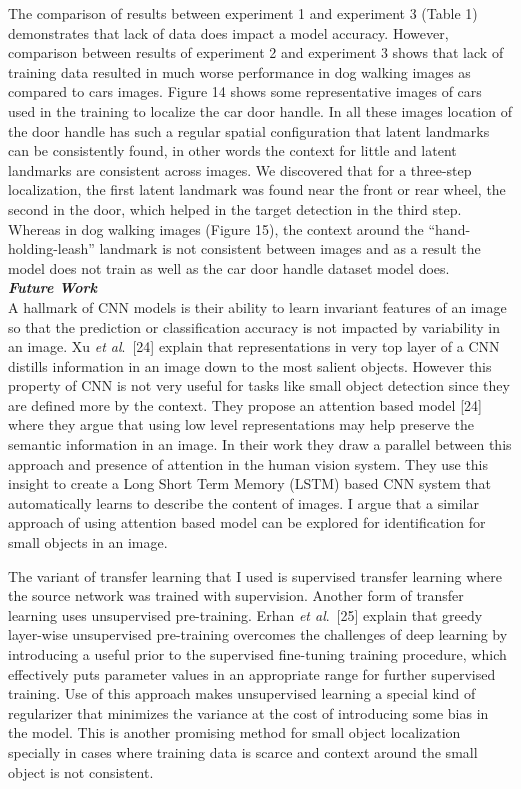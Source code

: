 \documentclass [11pt,letterpaper ,twoside ,openany ]{report}
\begin{document}
    The comparison of results between experiment 1 and experiment 3 (Table 1) demonstrates that lack of data does impact a model accuracy. However, comparison between results of experiment 2 and experiment 3 shows that lack of training data resulted in much worse performance in dog walking images as compared to cars images. Figure 14 shows some representative images of cars used in the training to localize the car door handle. In all these images location of the door handle has such a regular spatial configuration that latent landmarks can be consistently found, in other words the context for little and latent landmarks are consistent across images. We discovered that for a three-step localization, the first latent landmark was found near the front or rear wheel, the second in the door, which helped in the target detection in the third step. Whereas in dog walking images (Figure 15), the context around the ``hand-holding-leash'' landmark is not consistent between images and as a result the model does not train as well as the car door handle dataset model does.\\

    \noindent
    \textbf{\textit{Future Work}}\\                   
    \doublespacing
    A hallmark of CNN models is their ability to learn invariant features of an image so that the prediction or classification accuracy is not impacted by variability in an image. Xu \textit {et al}.\ [24] explain that representations in very top layer of a CNN distills information in an image down to the most salient objects. However this property of CNN is not very useful for tasks like small object detection since they are defined more by the context. They propose an attention based model [24] where they argue that using low level representations may help preserve the semantic information in an image. In their work they draw a parallel between this approach and presence of attention in the human vision system. They use this insight to create a Long Short Term Memory (LSTM) based CNN system that automatically learns to describe the content of images. I argue that a similar approach of using attention based model can be explored for identification for small objects in an image.

    The variant of transfer learning that I used is supervised transfer learning where the source network was trained with supervision. Another form of transfer learning uses unsupervised pre-training. Erhan \textit {et al}.\ [25] explain that greedy layer-wise unsupervised pre-training overcomes the challenges of deep learning by introducing a useful prior to the supervised fine-tuning training procedure, which effectively puts parameter values in an appropriate range for further supervised training. Use of this approach makes unsupervised learning a special kind of regularizer that minimizes the variance at the cost of introducing some bias in the model. This is another promising method for small object localization specially in cases where training data is scarce and context around the small object is not consistent.
\end{document}
